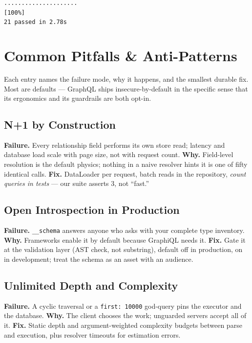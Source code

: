 \begin{verbatim}
.....................                                                    [100%]
21 passed in 2.78s
\end{verbatim}

\section{Common Pitfalls \& Anti-Patterns}
\label{sec:ch12-pitfalls}

Each entry names the failure mode, why it happens, and the smallest
durable fix. Most are defaults --- GraphQL ships insecure-by-default in
the specific sense that its ergonomics and its guardrails are both
opt-in.

\subsection{N+1 by Construction}
\textbf{Failure.} Every relationship field performs its own store read;
latency and database load scale with page size, not with request count.
\textbf{Why.} Field-level resolution is the default physics; nothing in a
naive resolver hints it is one of fifty identical calls.
\textbf{Fix.} DataLoader per request, batch reads in the repository,
\emph{count queries in tests} --- our suite asserts 3, not ``fast.''

\subsection{Open Introspection in Production}
\textbf{Failure.} \texttt{\_\_schema} answers anyone who asks with your
complete type inventory. \textbf{Why.} Frameworks enable it by default
because GraphiQL needs it. \textbf{Fix.} Gate it at the validation layer
(AST check, not substring), default off in production, on in development;
treat the schema as an asset with an audience.

\subsection{Unlimited Depth and Complexity}
\textbf{Failure.} A cyclic traversal or a \texttt{first: 10000} god-query
pins the executor and the database. \textbf{Why.} The client chooses the
work; unguarded servers accept all of it. \textbf{Fix.} Static depth and
argument-weighted complexity budgets between parse and execution, plus
resolver timeouts for estimation errors.

